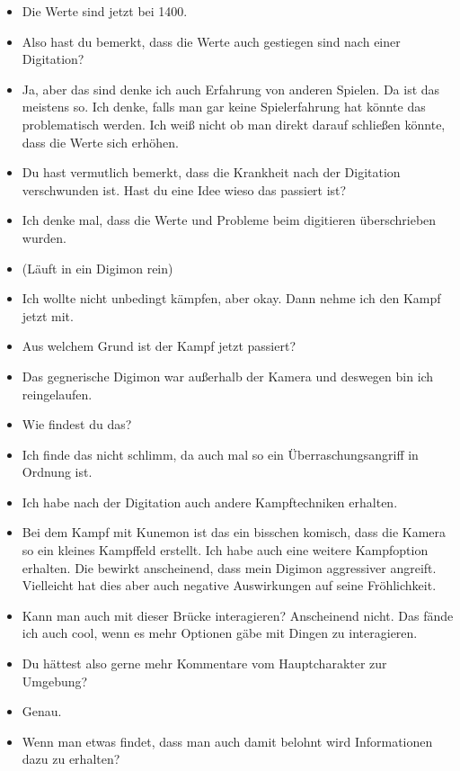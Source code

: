 {\begin{itemize}[]
    \item {} Die Werte sind jetzt bei 1400.
    \item {} Also hast du bemerkt, dass die Werte auch gestiegen sind nach einer Digitation?
    \item {} Ja, aber das sind denke ich auch Erfahrung von anderen Spielen. Da ist das meistens so. Ich denke, falls man gar keine Spielerfahrung hat könnte das problematisch werden. Ich weiß nicht ob man direkt darauf schließen könnte, dass die Werte sich erhöhen.
    \item {} Du hast vermutlich bemerkt, dass die Krankheit nach der Digitation verschwunden ist. Hast du eine Idee wieso das passiert ist?
    \item {} Ich denke mal, dass die Werte und Probleme beim digitieren überschrieben wurden.
    \item {} (Läuft in ein Digimon rein)
    \item {} Ich wollte nicht unbedingt kämpfen, aber okay. Dann nehme ich den Kampf jetzt mit.
    \item {} Aus welchem Grund ist der Kampf jetzt passiert?
    \item {} Das gegnerische Digimon war außerhalb der Kamera und deswegen bin ich reingelaufen. 
    \item {} Wie findest du das?
    \item {} Ich finde das nicht schlimm, da auch mal so ein Überraschungsangriff in Ordnung ist.
    \item {} Ich habe nach der Digitation auch andere Kampftechniken erhalten.
    \item {} Bei dem Kampf mit Kunemon ist das ein bisschen komisch, dass die Kamera so ein kleines Kampffeld erstellt. Ich habe auch eine weitere Kampfoption erhalten. Die bewirkt anscheinend, dass mein Digimon aggressiver angreift. Vielleicht hat dies aber auch negative Auswirkungen auf seine Fröhlichkeit. 
    \item {} Kann man auch mit dieser Brücke interagieren? Anscheinend nicht. Das fände ich auch cool, wenn es mehr Optionen gäbe mit Dingen zu interagieren.
    \item {} Du hättest also gerne mehr Kommentare vom Hauptcharakter zur Umgebung?
    \item {} Genau.
    \item {} Wenn man etwas findet, dass man auch damit belohnt wird Informationen dazu zu erhalten?

\end{itemize}}
